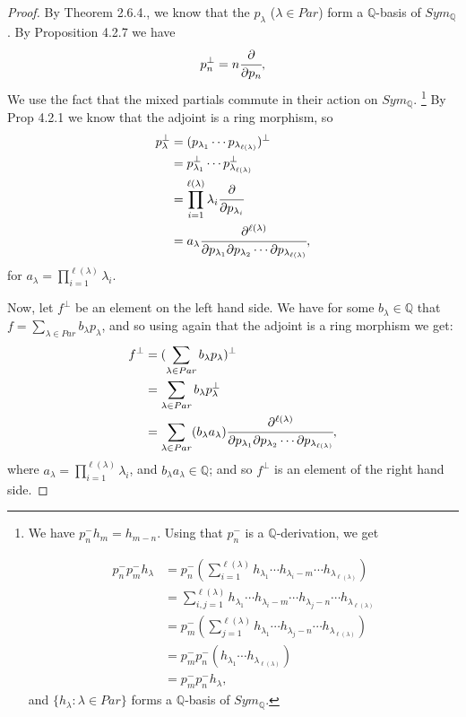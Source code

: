 \documentclass[8pt]{extarticle}
\newcommand{\set}[1]{\{#1\}}
\newcommand{\Q}{\mathbb{Q}}
\newcommand{\<}{\langle}
\renewcommand{\>}{\rangle}
\theoremstyle{definition}
\begin{document}
\begin{proof}
  By Theorem 2.6.4., we know that the $p_\lambda$ ($\lambda \in Par$) form a $\Q$-basis of $Sym_\Q$. By Proposition 4.2.7 we have
  \begin{align*}
    p_n^{\perp} = n \cfrac{\partial}{\partial p_n},
  \end{align*}
  We use the fact that the mixed partials commute in their action on $Sym_\Q$.
  \footnote{We have $p_n^- h_m = h_{m-n}$. Using that $p_n^-$ is a $\Q$-derivation, we get 

  \begin{align*}
    p_n^-p_m^- h_{\lambda}
    &=
    p_n^-(\sum\limits_{i=1}^{\ell(\lambda)} h_{\lambda_1} \cdots h_{\lambda_i-m} \cdots  h_{\lambda_{\ell(\lambda)}}) \\
    &=
    \sum\limits_{i,j=1}^{\ell(\lambda)} h_{\lambda_1} \cdots h_{\lambda_i-m} \cdots h_{\lambda_j-n} \cdots h_{\lambda_{\ell(\lambda)}} \\    
    &=
    p_m^-(\sum\limits_{j=1}^{\ell(\lambda)} h_{\lambda_1} \cdots h_{\lambda_j-n} \cdots  h_{\lambda_{\ell(\lambda)}}) \\
    &=
    p_m^-p_n^-(h_{\lambda_1} \cdots h_{\lambda_{\ell(\lambda)}}) \\
    &=
    p_m^-p_n^-h_{\lambda},
  \end{align*}
  and $\set{h_{\lambda} : \lambda \in Par}$ forms a $\Q$-basis of $Sym_{\Q}$.}
  By Prop 4.2.1 we know that the adjoint is a ring morphism, so
  \begin{align*}
    p_{\lambda}^{\perp} &=
    (p_{\lambda_1} \cdots p_{\lambda_{\ell(\lambda)}})^{\perp} \\
    &= p_{\lambda_1}^{\perp} \cdots p_{\lambda_{\ell(\lambda)}}^{\perp} \\
    &= \prod_{i=1}^{\ell(\lambda)} \lambda_i \cfrac{\partial}{\partial p_{\lambda_i}} \\
    &= a_{\lambda} \cfrac{\partial^{\ell(\lambda)}}{\partial p_{\lambda_1}\partial p_{\lambda_2} \cdots \partial p_{\lambda_{\ell(\lambda)}}},
  \end{align*}
  for $a_{\lambda} = \prod\limits_{i=1}^{\ell(\lambda)} \lambda_i$.

  Now, let $f^{\perp}$ be an element on the left hand side. We have for some $b_\lambda \in \Q$ that $f = \sum\limits_{\lambda \in Par} b_{\lambda} p_{\lambda}$, and so using again that the adjoint is a ring morphism we get:
  \begin{align*}
    f^{\perp}
    &=
    (\sum\limits_{\lambda \in Par} b_{\lambda} p_{\lambda})^{\perp}
    \\
    &=
    \sum\limits_{\lambda \in Par} b_{\lambda} p_{\lambda}^{\perp}    \\
    &=
    \sum\limits_{\lambda \in Par} (b_{\lambda} a_{\lambda}) \cfrac{\partial^{\ell(\lambda)}}{\partial p_{\lambda_1}\partial p_{\lambda_2} \cdots \partial p_{\lambda_{\ell(\lambda)}}}, 
  \end{align*}
  where $a_{\lambda} = \prod\limits_{i=1}^{\ell(\lambda)} \lambda_i$, and $b_{\lambda} a_{\lambda} \in \Q$; and so $f^{\perp}$ is an element of the right hand side.


\end{proof}
\end{document}
